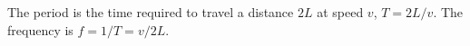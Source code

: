 The period is the time required to travel a distance $2L$ at speed
$v$, $T=2L/v$. The frequency is $f=1/T=v/2L$.

